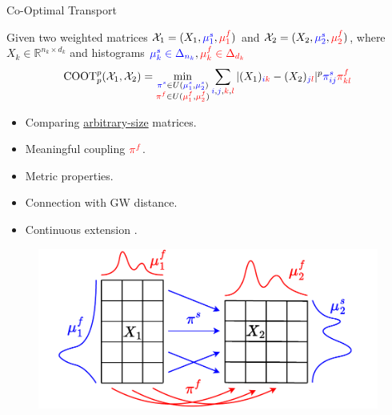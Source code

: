 \documentclass{beamer}
\newcommand{\coot}{\text{COOT}}
\newcommand{\cX}{\mathcal X}
\newcommand{\bbR}{\mathbb R}
\newcommand{\pis}{{\color{blue}{\pi^s}}}
\newcommand{\pif}{{\color{red}{\pi^f}}}
\newcommand{\mfsrc}{{\color{red}{\mu_1^f}}}
\newcommand{\mftg}{{\color{red}{\mu_2^f}}}
\newcommand{\mssrc}{{\color{blue}{\mu_1^s}}}
\newcommand{\mstg}{{\color{blue}{\mu_2^s}}}
\begin{document}
\begin{frame}{Co-Optimal Transport}
\tiny
\begin{definition}
Given two weighted matrices $\cX_1 = (X_1, \mssrc, \mfsrc)$
and $\cX_2 = (X_2, \mstg, \mftg)$, where
$X_k \in \bbR^{n_k \times d_k}$ and histograms
${\color{blue}{\mu^s_k \in \Delta_{n_k}}}, {\color{red}{\mu^f_k \in \Delta_{d_k}}}$
\begin{align*}
  \coot_p^p(\cX_1, \cX_2) =
  \min_{\substack{\pis \in U(\mssrc,\mstg) \\ \pif \in U(\mfsrc,\mftg)}}
  \sum_{{\color{blue}{i}},{\color{blue}{j}},{\color{red}{k}},{\color{red}{l}}}
  |(X_1)_{{\color{blue}{i}} {\color{red}{k}}} - (X_2)_{{\color{blue}{j}}{\color{red}{l}}}|^p {\color{blue}{\pi^s_{ij}}} {\color{red}{\pi^f_{kl}}}
\end{align*}
\end{definition}

\begin{minipage}[t]{0.6\linewidth}
  \begin{itemize}
    \item Comparing \underline{arbitrary-size} matrices.
    \item Meaningful {\color{red}{feature}} coupling $\pif$.
    \item Metric properties.
    \item Connection with GW distance.
    \item Continuous extension \parencite{Chowdhury21b}.
  \end{itemize}
  \end{minipage}%
  \hfill%
  \hspace{-6cm}
  \begin{minipage}[t]{0.55\linewidth}
    \vspace{0cm}
  \begin{figure}
    \centering
    \includegraphics[width=1.2\linewidth, keepaspectratio=true]{OT_new/coot_matrix_ot.pdf}
  \end{figure}
  \end{minipage}
\end{frame}
\end{document}
